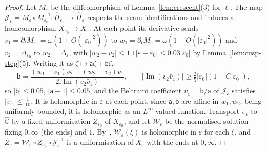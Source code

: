 \documentclass[11pt]{amsart}
\theoremstyle{definition}
\newcommand{\ii}{\mathrm{i}}
\begin{document}
\begin{proof}
Let $M_\varepsilon$ be the diffeomorphism of Lemma~\ref{lem:crescent}(3) for $\ell$.  The map
$\mathcal J_\varepsilon=M_\varepsilon\circ M_{\varepsilon_0}^{-1}:\hat H_{\varepsilon_0}\to\hat H_\varepsilon$ respects the seam
identifications and induces a homeomorphism $X_{\varepsilon_0}\to X_\varepsilon$.  At each point
its derivative sends $v_1=\partial_tM_{\varepsilon_0}=\omega(1+O(|\varepsilon_0|^2))$ to
$w_1=\partial_tM_\varepsilon=\omega(1+O(|\varepsilon_0|^2))$ and $v_2=\Delta_{\varepsilon_0}$ to $w_2=\Delta_\varepsilon$, with
$|w_2-v_2|\le1.1|\varepsilon-\varepsilon_0|\le0.03|\varepsilon_0|$ by Lemma~\ref{lem:cusp-step}(5).  Writing
it as $\zeta\mapsto\mathsf a\zeta+\mathsf b\bar\zeta$,
\[
 \mathsf b=\frac{(w_1-v_1)v_2-(w_2-v_2)v_1}{2\ii\operatorname{Im}(v_2\bar v_1)},\qquad
 |\operatorname{Im}(v_2\bar v_1)|\ge\tfrac25|\varepsilon_0|(1-C|\varepsilon_0|),
\]
so $|\mathsf b|\le0.05$, $|\mathsf a-1|\le0.05$, and the Beltrami coefficient
$\upsilon_\varepsilon=\mathsf b/\mathsf a$ of $\mathcal J_\varepsilon$ satisfies $|\upsilon_\varepsilon|\le\tfrac1{10}$.  It is holomorphic in $\varepsilon$ at
each point, since $\mathsf a,\mathsf b$ are affine in $w_1,w_2$; being uniformly bounded,
it is holomorphic as an $L^\infty$-valued function.  Transport $\upsilon_\varepsilon$ to $\hat{\mathbb C}$
by a fixed uniformisation $Z_{\varepsilon_0}$ of $X_{\varepsilon_0}$, and let $\mathcal W_\varepsilon$ be the normalised
solution fixing $0,\infty$ (the ends) and $1$.  By~\cite[Thm.~11]{AhlforsBers1960},
$\mathcal W_\varepsilon(\xi)$ is holomorphic in $\varepsilon$ for each $\xi$, and
$Z_\varepsilon=\mathcal W_\varepsilon\circ Z_{\varepsilon_0}\circ\mathcal J_\varepsilon^{-1}$ is a uniformisation of $X_\varepsilon$ with the
ends at $0,\infty$.


\end{proof}
\end{document}
